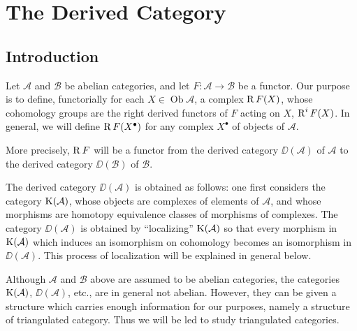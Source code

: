 \chapter{The Derived Category}

\setcounter{section}{-1}
\section{Introduction}\label{sec:1.0}
Let $\mathcal{A}$ and $\mathcal{B}$ be abelian categories, and let $F\colon \mathcal{A}\to\mathcal{B}$ be a functor. Our purpose is to define, functorially for each $X\in\operatorname{Ob}\mathcal{A}$, a complex $\operatorname{R} F(X)$, whose cohomology groups are the right derived functors of $F$ acting on $X$, $\operatorname{R}^iF(X)$. In general, we will define $\operatorname{R} F(X^\bullet)$ for any complex $X^\bullet$ of objects of $\mathcal{A}$.

More precisely, $\operatorname{R} F$ will be a functor from the derived category $\DD(\mathcal{A})$ of $\mathcal{A}$ to the derived category $\DD(\mathcal{B})$ of $\mathcal{B}$.

The derived category $\DD(\mathcal{A})$ is obtained as follows: one first considers the category $\operatorname{K}(\mathcal{A})$, whose objects are complexes of elements of $\mathcal{A}$, and whose morphisms are homotopy equivalence classes of morphisms of complexes. The category $\DD(\mathcal{A})$ is obtained by ``localizing'' $\operatorname{K}(\mathcal{A})$ so that every morphism in $\operatorname{K}(\mathcal{A})$ which induces an isomorphism on cohomology becomes an isomorphism in $\DD(\mathcal{A})$. This process of localization will be explained in general below.

Although $\mathcal{A}$ and $\mathcal{B}$ above are assumed to be abelian categories, the categories $\operatorname{K}(\mathcal{A})$, $\DD(\mathcal{A})$, etc., are in general not abelian. However, they can be given a structure which carries enough information for our purposes, namely a structure of triangulated category. Thus we will be led to study triangulated categories.

